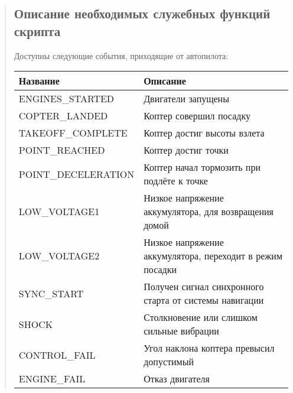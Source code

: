 \documentclass[a4paper,10pt,russian]{sphinxmanual}
\begin{document}
\begin{quote}
\begin{sphinxVerbatim}[commandchars=\\\{\}]
    
    
         
\end{sphinxVerbatim}


\subsection{Описание необходимых служебных функций скрипта}
\label{\detokenize{programming/lua/lua:id5}}
%
\begin{sphinxVerbatim}[commandchars=\\\{\}]
  
\end{sphinxVerbatim}

Доступны следующие события, приходящие от автопилота:


\begin{savenotes}\sphinxattablestart
\centering
\begin{tabulary}{\linewidth}[t]{|T|T|}
\hline
\sphinxstyletheadfamily 
Название
&\sphinxstyletheadfamily 
Описание
\\
\hline
ENGINES\_STARTED
&
Двигатели запущены
\\
\hline
COPTER\_LANDED
&
Коптер совершил посадку
\\
\hline
TAKEOFF\_COMPLETE
&
Коптер достиг высоты взлета
\\
\hline
POINT\_REACHED
&
Коптер достиг точки
\\
\hline
POINT\_DECELERATION
&
Коптер начал тормозить при подлёте к точке
\\
\hline
LOW\_VOLTAGE1
&
Низкое напряжение аккумулятора, для возвращения домой
\\
\hline
LOW\_VOLTAGE2
&
Низкое напряжение аккумулятора, переходит в режим посадки
\\
\hline
SYNC\_START
&
Получен сигнал синхронного старта от системы навигации
\\
\hline
SHOCK
&
Столкновение или слишком сильные вибрации
\\
\hline
CONTROL\_FAIL
&
Угол наклона коптера превысил допустимый
\\
\hline
ENGINE\_FAIL
&
Отказ двигателя
\\
\hline
\end{tabulary}
\par
\sphinxattableend\end{savenotes}


\end{quote}
\end{document}
